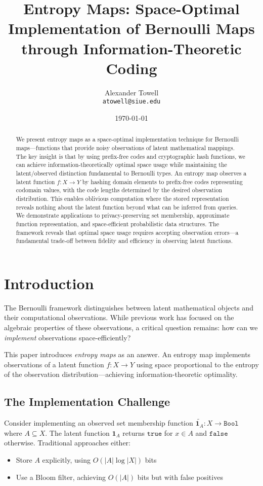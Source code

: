 \documentclass[11pt,final,hidelinks]{article}
\title{Entropy Maps: Space-Optimal Implementation of Bernoulli Maps through Information-Theoretic Coding}
\author{
    Alexander Towell\\
    \texttt{atowell@siue.edu}
}
\date{\today}
\newcommand{\obs}[1]{\widetilde{#1}}  %
\newcommand{\Indicator}[1]{\mathbf{1}_{#1}}
\newcommand{\Card}[1]{\lvert#1\rvert}
\newcommand{\Type}[1]{\mathtt{#1}}
\newcommand{\Bool}{\Type{Bool}}
\newcommand{\True}{\mathtt{true}}
\newcommand{\False}{\mathtt{false}}
\begin{document}
\maketitle

\begin{abstract}
We present entropy maps as a space-optimal implementation technique for Bernoulli maps—functions that provide noisy observations of latent mathematical mappings. The key insight is that by using prefix-free codes and cryptographic hash functions, we can achieve information-theoretically optimal space usage while maintaining the latent/observed distinction fundamental to Bernoulli types. An entropy map observes a latent function $f: X \to Y$ by hashing domain elements to prefix-free codes representing codomain values, with the code lengths determined by the desired observation distribution. This enables oblivious computation where the stored representation reveals nothing about the latent function beyond what can be inferred from queries. We demonstrate applications to privacy-preserving set membership, approximate function representation, and space-efficient probabilistic data structures. The framework reveals that optimal space usage requires accepting observation errors—a fundamental trade-off between fidelity and efficiency in observing latent functions.
\end{abstract}

\section{Introduction}

The Bernoulli framework distinguishes between latent mathematical objects and their computational observations. While previous work has focused on the algebraic properties of these observations, a critical question remains: how can we \emph{implement} observations space-efficiently?

This paper introduces \emph{entropy maps} as an answer. An entropy map implements observations of a latent function $f: X \to Y$ using space proportional to the entropy of the observation distribution—achieving information-theoretic optimality.

\subsection{The Implementation Challenge}

Consider implementing an observed set membership function $\obs{\Indicator{A}}: X \to \Bool$ where $A \subseteq X$. The latent function $\Indicator{A}$ returns $\True$ for $x \in A$ and $\False$ otherwise. Traditional approaches either:
\begin{itemize}
    \item Store $A$ explicitly, using $O(\Card{A} \log \Card{X})$ bits
    \item Use a Bloom filter, achieving $O(\Card{A})$ bits but with false positives
\end{itemize}
\end{document}
